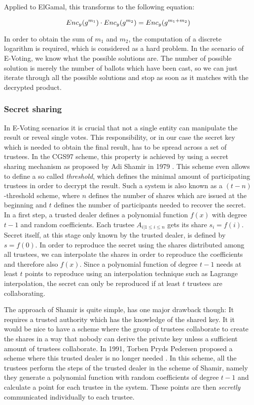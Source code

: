 \documentclass[numbers=noenddot, abstract=on]{scrreprt}
\begin{document}
Applied to ElGamal, this transforms to the following equation:

\begin{equation}
Enc_y(g^{m_1}) \cdot Enc_y(g^{m_2}) = Enc_y(g^{m_1 + m_2}) \notag
\end{equation}

In order to obtain the sum of $m_1$ and $m_2$, the computation of a discrete
logarithm is required, which is considered as a hard problem. In the scenario of
E-Voting, we know what the possible solutions are. The number of possible
solution is merely the number of ballots which have been cast, so we can just
iterate through all the possible solutions and stop as soon as it matches with
the decrypted product.


\subsubsection{Secret sharing}
\label{sec:secretsharing}
In E-Voting scenarios it is crucial that not a
single entity can manipulate the result or reveal single votes. This
responsibility, or in our case the secret key which is needed to obtain the
final result, has to be spread across a set of trustees. In the CGS97 scheme,
this property is achieved by using a secret sharing mechanism as proposed by Adi
Shamir in 1979 \cite{Shamir79}. This scheme even allows to define a so called
\textit{threshold}, which defines the minimal amount of participating trustees
in order to decrypt the result. Such a system is also known as a
$(t-n)$-threshold scheme, where $n$ defines the number of shares which are
issued at the beginning and $t$ defines the number of participants needed to
recover the secret. In a first step, a trusted dealer defines a polynomial
function $f(x)$ with degree $t-1$ and random coefficients. Each trustee $A_{i |
1 \leq i \leq n}$ gets its share $s_i=f(i)$. Secret itself, at this stage only
known by the trusted dealer, is defined by $s=f(0)$. In order to reproduce the
secret using the shares distributed among all trustees, we can interpolate the
shares in order to reproduce the coefficients and therefore also $f(x)$. Since a
polynomial function of degree $t-1$ needs at least $t$ points to reproduce using
an interpolation technique such as Lagrange interpolation, the secret can only
be reproduced if at least $t$ trustees are collaborating. 

The approach of Shamir is quite simple, has one major drawback though: It
requires a trusted authority which has the knowledge of the shared key. It it
would be nice to have a scheme where the group of trustees collaborate to create
the shares in a way that nobody can derive the private key unless a sufficient
amount of trustees collaborate. In 1991, Torben Pryds Pedersen proposed a scheme
where this trusted dealer is no longer needed \cite{PED91}. In this scheme, all the
trustees perform the steps of the trusted dealer in the scheme of Shamir, namely
they generate a polynomial function with random coefficients of degree $t-1$ and
calculate a point for each trustee in the system. These points are then
\textit{secretly} communicated individually to each trustee.
\end{document}

